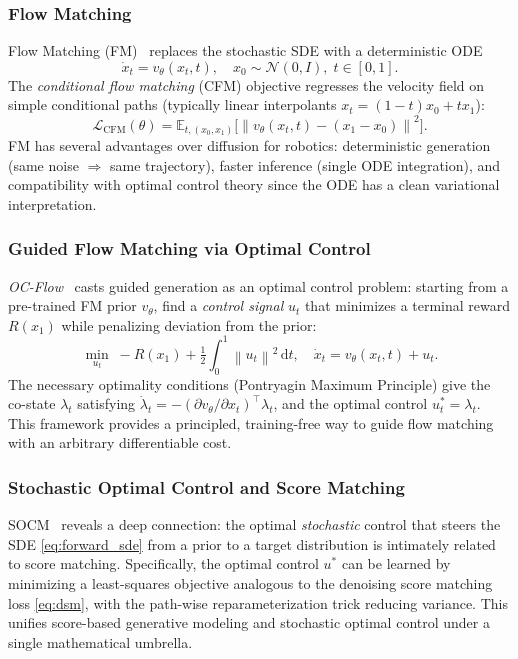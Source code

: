 \documentclass[letterpaper, 10pt, conference]{ieeeconf}
\newcommand{\E}{\mathbb{E}}
\newcommand{\norm}[1]{\left\|#1\right\|}
\newcommand{\dd}{\mathrm{d}}
\begin{document}
\subsubsection{Flow Matching}
Flow Matching (FM)~\cite{lipman2023flow} replaces the stochastic SDE with a
deterministic ODE
\begin{equation}
  \dot{x}_t = v_\theta(x_t,t),\quad x_0\sim\mathcal{N}(0,I),\; t\in[0,1].
  \label{eq:fm_ode}
\end{equation}
The \emph{conditional flow matching} (CFM) objective regresses the velocity
field on simple conditional paths (typically linear interpolants
$x_t = (1-t)x_0 + tx_1$):
\begin{equation}
  \mathcal{L}_{\mathrm{CFM}}(\theta)
  = \E_{t,(x_0,x_1)}\!\bigl[\norm{v_\theta(x_t,t) - (x_1-x_0)}^2\bigr].
  \label{eq:cfm}
\end{equation}
FM has several advantages over diffusion for robotics: deterministic
generation (same noise $\Rightarrow$ same trajectory), faster inference (single
ODE integration), and compatibility with optimal control theory since the ODE
has a clean variational interpretation.

\subsubsection{Guided Flow Matching via Optimal Control}
\textit{OC-Flow}~\cite{ocflow} casts guided generation as an optimal
control problem: starting from a pre-trained FM prior $v_\theta$, find a
\emph{control signal} $u_t$ that minimizes a terminal reward $R(x_1)$ while
penalizing deviation from the prior:
\begin{equation}
  \min_{u_t} \;-R(x_1) + \tfrac{1}{2}\int_0^1\norm{u_t}^2\,\dd t,\quad
  \dot{x}_t = v_\theta(x_t,t) + u_t.
  \label{eq:ocflow}
\end{equation}
The necessary optimality conditions (Pontryagin Maximum Principle) give the
co-state $\lambda_t$ satisfying $\dot{\lambda}_t = -(\partial v_\theta/\partial x_t)^\top\lambda_t$,
and the optimal control $u_t^* = \lambda_t$.  This framework provides a
principled, training-free way to guide flow matching with an arbitrary
differentiable cost.

\subsubsection{Stochastic Optimal Control and Score Matching}
SOCM~\cite{domingoenrich2024socm} reveals a deep connection: the optimal
\emph{stochastic} control that steers the SDE \eqref{eq:forward_sde} from a
prior to a target distribution is intimately related to score matching.
Specifically, the optimal control $u^*$ can be learned by minimizing a
least-squares objective analogous to the denoising score matching loss
\eqref{eq:dsm}, with the path-wise reparameterization trick reducing variance.
This unifies score-based generative modeling and stochastic optimal control
under a single mathematical umbrella.
\end{document}
